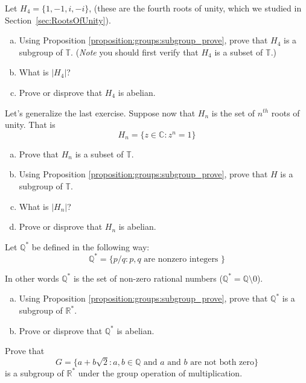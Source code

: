 \begin{exercise}{67}
Let  $H_4 = \{ 1, -1, i, -i \}$, (these are the  fourth roots of unity, which we studied in Section~\ref{sec:RootsOfUnity}).  
\begin{enumerate}[(a)]
\item
Using Proposition \ref{proposition:groups:subgroup_prove}, prove that $H_4$ is a subgroup of ${\mathbb T}$. (\emph{Note} you should first verify that $H_4$ is a subset of ${\mathbb T}$.)
\item  
What is $| H_4 |$?
\item
Prove or disprove that $H_4$ is abelian.
\end{enumerate}
\end{exercise}

\begin{exercise}{68}
Let's generalize the last exercise.  Suppose now that $H_n$ is the set of \emph{$n^{th}$} roots of unity.  That is 
\[
H_n = \{z \in {\mathbb C} : z^n = 1\} \]

\begin{enumerate}[(a)]
\item
Prove that $H_n$ is a subset of ${\mathbb T}$.
\item
Using Proposition \ref{proposition:groups:subgroup_prove}, prove that $H$ is a subgroup of ${\mathbb T}$.
\item  
What is $| H_n |$?
\item
Prove or disprove that $H_n$ is abelian.
\end{enumerate}
\end{exercise}

\begin{exercise}{69}
Let ${\mathbb Q}^*\label{noteQstar}$ be defined in the following way:
\[
{\mathbb Q}^* = \{ p/q : p, q \mbox{ are nonzero integers } \}
\]

In other words ${\mathbb Q}^*$ is the set of non-zero rational numbers (${\mathbb Q}^* = {\mathbb Q} \setminus 0$).

\begin{enumerate}[(a)]
\item
Using Proposition \ref{proposition:groups:subgroup_prove}, prove that ${\mathbb Q}^*$ is a subgroup of ${\mathbb R}^*$.
\item
Prove or disprove that ${\mathbb Q}^*$ is abelian.
\end{enumerate}
\end{exercise}


\begin{exercise}{}
Prove that
\[
G =
\{ a + b \sqrt{2} : \mbox{$a, b \in {\mathbb
Q}$ and $a$ and $b$ are not both zero}  \}
\]
is a subgroup of ${\mathbb R}^{\ast}$ under the group operation of
multiplication. 
\end{exercise} 

